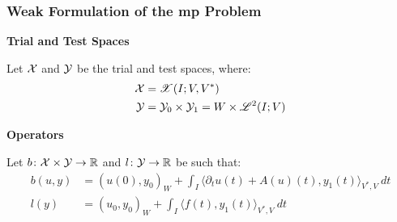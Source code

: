 \begin{frame}
    \frametitle{Weak Formulation of the \acrshort{mp} Problem}

    \vspace*{\fill}
    \begin{center}
        {\color{\accentcolor} \Large \textbf{Trial and Test Spaces}}
        \vspace*{0.25cm}

        \begin{minipage}{0.75\textwidth}
            \begin{definition}
                Let $\mathcal{X}$ and $\mathcal{Y}$ be the trial and test spaces, where:
                \begin{align*}
                    \mathcal{X} &= \mathscr{X}(I; V, V^*) \\
                    \mathcal{Y} &= \mathcal{Y}_0 \times \mathcal{Y}_1 = W \times \mathscr{L}^{2}(I; V)
                \end{align*}
            \end{definition}
        \end{minipage}
    \end{center}

    \vspace*{\fill}

    \begin{center}
        {\color{\accentcolor} \Large \textbf{Operators}}
        \vspace*{0.25cm}

        \begin{minipage}{0.75\textwidth}
            \begin{definition}
                Let $b \colon \mathcal{X} \times \mathcal{Y} \rightarrow \mathbb{R}$ and $l \colon \mathcal{Y} \rightarrow \mathbb{R}$ be such that:
                \begin{align*}
                    b(u, y) &= \left( u(0), y_0 \right)_W + \int_I \langle \partial_t u(t) + A(u)(t), y_1(t) \rangle_{V^*, V} ~ dt \\
                    l(y) &= \left( u_0, y_0 \right)_W + \int_I \langle f(t), y_1(t) \rangle_{V^*, V} ~ dt
                \end{align*}
            \end{definition}
        \end{minipage}
    \end{center}
    \vspace*{\fill}
    
\end{frame}

